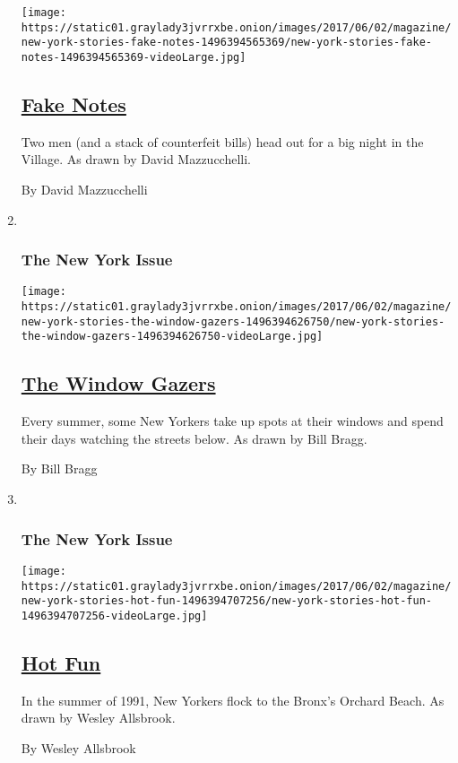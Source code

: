 \begin{enumerate}
  \texttt{[image: https://static01.graylady3jvrrxbe.onion/images/2017/06/02/magazine/new-york-stories-fake-notes-1496394565369/new-york-stories-fake-notes-1496394565369-videoLarge.jpg]}

  \hypertarget{fake-notes}{%
  \subsection{\texorpdfstring{\href{/interactive/2017/06/02/magazine/new-york-stories-fake-notes.html}{Fake
  Notes}}{Fake Notes}}\label{fake-notes}}

  Two men (and a stack of counterfeit bills) head out for a big night in
  the Village. As drawn by David Mazzucchelli.

  By David Mazzucchelli
\item ~
  \hypertarget{the-new-york-issue-7}{%
  \subsubsection{The New York Issue}\label{the-new-york-issue-7}}

  \texttt{[image: https://static01.graylady3jvrrxbe.onion/images/2017/06/02/magazine/new-york-stories-the-window-gazers-1496394626750/new-york-stories-the-window-gazers-1496394626750-videoLarge.jpg]}

  \hypertarget{the-window-gazers}{%
  \subsection{\texorpdfstring{\href{/interactive/2017/06/02/magazine/new-york-stories-the-window-gazers.html}{The
  Window Gazers}}{The Window Gazers}}\label{the-window-gazers}}

  Every summer, some New Yorkers take up spots at their windows and
  spend their days watching the streets below. As drawn by Bill Bragg.

  By Bill Bragg
\item ~
  \hypertarget{the-new-york-issue-8}{%
  \subsubsection{The New York Issue}\label{the-new-york-issue-8}}

  \texttt{[image: https://static01.graylady3jvrrxbe.onion/images/2017/06/02/magazine/new-york-stories-hot-fun-1496394707256/new-york-stories-hot-fun-1496394707256-videoLarge.jpg]}

  \hypertarget{hot-fun}{%
  \subsection{\texorpdfstring{\href{/interactive/2017/06/02/magazine/new-york-stories-hot-fun.html}{Hot
  Fun}}{Hot Fun}}\label{hot-fun}}

  In the summer of 1991, New Yorkers flock to the Bronx's Orchard Beach.
  As drawn by Wesley Allsbrook.

  By Wesley Allsbrook
\end{enumerate}

